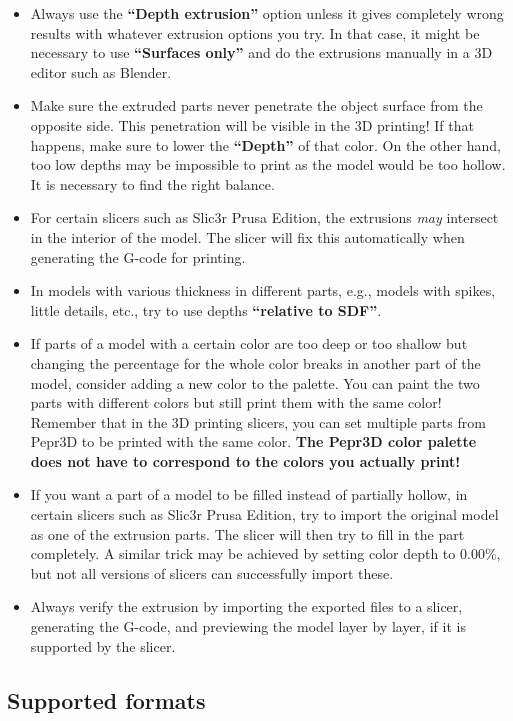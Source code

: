 \begin{itemize}
\item Always use the \textbf{``Depth extrusion''} option unless it gives completely wrong results with whatever extrusion options you try. In that case, it might be necessary to use \textbf{``Surfaces only''} and do the extrusions manually in a 3D editor such as Blender.
\item Make sure the extruded parts never penetrate the object surface from the opposite side. This penetration will be visible in the 3D printing! If that happens, make sure to lower the \textbf{``Depth''} of that color. On the other hand, too low depths may be impossible to print as the model would be too hollow. It is necessary to find the right balance.
\item For certain slicers such as Slic3r Prusa Edition, the extrusions \emph{may} intersect in the interior of the model. The slicer will fix this automatically when generating the G-code for printing.
\item In models with various thickness in different parts, e.g., models with spikes, little details, etc., try to use depths \textbf{``relative to SDF''}.
\item If parts of a model with a certain color are too deep or too shallow but changing the percentage for the whole color breaks in another part of the model, consider adding a new color to the palette. You can paint the two parts with different colors but still print them with the same color! Remember that in the 3D printing slicers, you can set multiple parts from Pepr3D to be printed with the same color. \textbf{The Pepr3D color palette does not have to correspond to the colors you actually print!}
\item If you want a part of a model to be filled instead of partially hollow, in certain slicers such as Slic3r Prusa Edition, try to import the original model as one of the extrusion parts. The slicer will then try to fill in the part completely. A similar trick may be achieved by setting color depth to $0.00\%$, but not all versions of slicers can successfully import these.
\item Always verify the extrusion by importing the exported files to a slicer, generating the G-code, and previewing the model layer by layer, if it is supported by the slicer.
\end{itemize}


\subsection{Supported formats}
\label{sec:exportformats}


